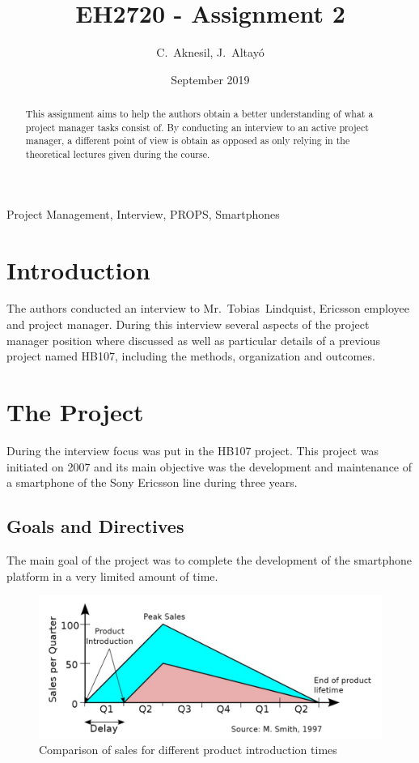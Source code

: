 \documentclass[journal]{IEEEtran}
\title{EH2720 - Assignment 2}
\author{C.~Aknesil, J.~Altayó}
\date{September 2019}
\begin{document}
\maketitle
\begin{abstract}
    This assignment aims to help the authors obtain a better understanding of what a project manager tasks consist of. By conducting an interview to an active project manager, a different point of view is obtain as opposed as only relying in the theoretical lectures given during the course.
\end{abstract}

\begin{IEEEkeywords}
    Project Management, Interview, PROPS, Smartphones
\end{IEEEkeywords}
\section{Introduction}
The authors conducted an interview to Mr.~Tobias~Lindquist, Ericsson employee and project manager. During this interview several aspects of the project manager position where discussed as well as particular details of a previous project named HB107, including the methods, organization and outcomes. 

\section{The Project}
During the interview focus was put in the HB107 project. This project was initiated on 2007 and its main objective was the development and maintenance of a smartphone of the Sony Ericsson line during three years.

\subsection{Goals and Directives}
The main goal of the project was to complete the development of the smartphone platform in a very limited amount of time. 

\begin{figure}[h]
    \centering
    \includegraphics[width=\linewidth]{sales.jpg}
    \caption{Comparison of sales for different product introduction times}
    \label{fig:sales}
\end{figure}
\end{document}
